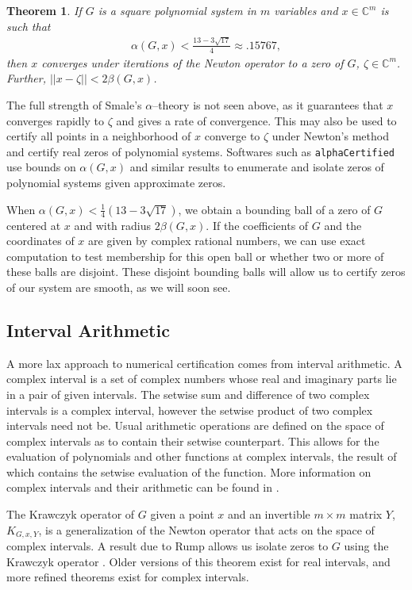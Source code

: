 \documentclass[12pt]{amsart}
\newtheorem{theorem}{Theorem}
\theoremstyle{definition}
\begin{document}
\begin{theorem}
If $G$ is a square polynomial system in $m$ variables and $x\in\mathbb{C}^m$ is such that
\begin{align*}
\alpha(G,x) < \frac{13-3\sqrt{17}}{4} \approx .15767,
\end{align*}
then $x$ converges under iterations of the Newton operator to a zero of $G$, $\zeta\in\mathbb{C}^m$. Further, $||x-\zeta||<2\beta(G,x)$. 
\end{theorem}

The full strength of Smale's $\alpha$--theory is not seen above, as it guarantees that $x$ converges rapidly to $\zeta$ and gives a rate of convergence. This may also be used to certify all points in a neighborhood of $x$ converge to $\zeta$ under Newton's method and certify real zeros of polynomial systems. Softwares such as \texttt{alphaCertified} \cite{alphaCertified} use bounds on $\alpha(G,x)$ and similar results to enumerate and isolate zeros of polynomial systems given approximate zeros. 

When $\alpha(G,x)<\frac{1}{4}(13-3\sqrt{17})$, we obtain a bounding ball of a zero of $G$ centered at $x$ and with radius $2\beta(G,x)$. If the coefficients of $G$ and the coordinates of $x$ are given by complex rational numbers, we can use exact computation to test membership for this open ball or whether two or more of these balls are disjoint. These disjoint bounding balls will allow us to certify zeros of our system are smooth, as we will soon see.

\subsection*{Interval Arithmetic}
A more lax approach to numerical certification comes from interval arithmetic. A complex interval is a set of complex numbers whose real and imaginary parts lie in a pair of given intervals. The setwise sum and difference of two complex intervals is a complex interval, however the setwise product of two complex intervals need not be. Usual arithmetic operations are defined on the space of complex intervals as to contain their setwise counterpart. This allows for the evaluation of polynomials and other functions at complex intervals, the result of which contains the setwise evaluation of the function. More information on complex intervals and their arithmetic can be found in \cite{Mayer}.

The Krawczyk operator of $G$ given a point $x$ and an invertible $m\times m$ matrix $Y$, $K_{G,x,Y}$, is a generalization of the Newton operator that acts on the space of complex intervals. A result due to Rump allows us isolate zeros to $G$ using the Krawczyk operator \cite{Rump}. Older versions of this theorem exist for real intervals, and more refined theorems exist for complex intervals.
\end{document}
